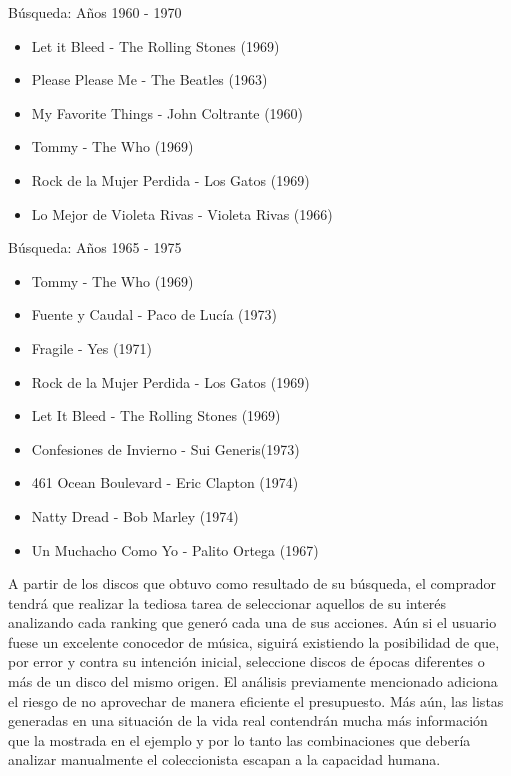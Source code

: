 \begin{mybox}{Búsqueda: Años 1960 - 1970}
\begin{itemize}
	\item {\scriptsize Let it Bleed - The Rolling Stones (1969)}
	\item {\scriptsize Please Please Me - The Beatles (1963)}
	\item {\scriptsize My Favorite Things - John Coltrante (1960)}
	\item {\scriptsize Tommy - The Who (1969)}
	\item {\scriptsize Rock de la Mujer Perdida - Los Gatos (1969)}
	\item {\scriptsize Lo Mejor de Violeta Rivas - Violeta Rivas (1966)}
\end{itemize}
\end{mybox}

\begin{mybox}{Búsqueda: Años 1965 - 1975}
\begin{itemize}
	\item {\scriptsize Tommy - The Who (1969)}
	\item {\scriptsize Fuente y Caudal - Paco de Lucía (1973)}
	\item {\scriptsize Fragile - Yes (1971)}
	\item {\scriptsize Rock de la Mujer Perdida - Los Gatos (1969)}
	\item {\scriptsize Let It Bleed - The Rolling Stones (1969)}
	\item {\scriptsize Confesiones de Invierno - Sui Generis(1973)}
	\item {\scriptsize 461 Ocean Boulevard - Eric Clapton (1974)}
	\item {\scriptsize Natty Dread - Bob Marley (1974)}
	\item {\scriptsize Un Muchacho Como Yo - Palito Ortega (1967)}
\end{itemize}
\end{mybox}

A partir de los discos que obtuvo como resultado de su búsqueda, el comprador tendrá que realizar la tediosa tarea de seleccionar aquellos de su interés analizando cada ranking que generó cada una de sus acciones. Aún si el usuario fuese un excelente conocedor de música, siguirá existiendo la posibilidad de que, por error y contra su intención inicial, seleccione discos de épocas diferentes o más de un disco del mismo origen. El análisis previamente mencionado adiciona el riesgo de no aprovechar de manera eficiente el presupuesto. Más aún, las listas generadas en una situación de la vida real contendrán mucha más información que la mostrada en el ejemplo y por lo tanto las combinaciones que debería analizar manualmente el coleccionista escapan a la capacidad humana. 

